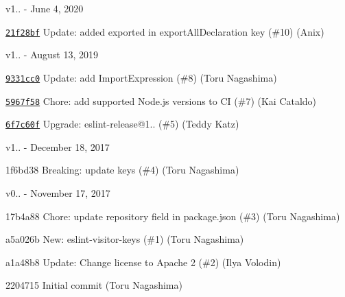 v1.. -\/ June 4, 2020


\begin{DoxyItemize}
\item \href{https://github.com/eslint/eslint-visitor-keys/commit/21f28bf11be5329d740a8bf6bdbcd0ef13bbf1a2}{\texttt{ {\ttfamily 21f28bf}}} Update\+: added exported in export\+All\+Declaration key (\#10) (Anix)
\end{DoxyItemize}

v1.. -\/ August 13, 2019


\begin{DoxyItemize}
\item \href{https://github.com/eslint/eslint-visitor-keys/commit/9331cc09e756e65b9044c9186445a474b037fac6}{\texttt{ {\ttfamily 9331cc0}}} Update\+: add Import\+Expression (\#8) (Toru Nagashima)
\item \href{https://github.com/eslint/eslint-visitor-keys/commit/5967f583b04f17fba9226aaa394e45d476d2b8af}{\texttt{ {\ttfamily 5967f58}}} Chore\+: add supported Node.\+js versions to CI (\#7) (Kai Cataldo)
\item \href{https://github.com/eslint/eslint-visitor-keys/commit/6f7c60fef2ceec9f6323202df718321cec45cab0}{\texttt{ {\ttfamily 6f7c60f}}} Upgrade\+: eslint-\/release@1.. (\#5) (Teddy Katz)
\end{DoxyItemize}

v1.. -\/ December 18, 2017


\begin{DoxyItemize}
\item 1f6bd38 Breaking\+: update keys (\#4) (Toru Nagashima)
\end{DoxyItemize}

v0.. -\/ November 17, 2017


\begin{DoxyItemize}
\item 17b4a88 Chore\+: update {\ttfamily repository} field in package.\+json (\#3) (Toru Nagashima)
\item a5a026b New\+: eslint-\/visitor-\/keys (\#1) (Toru Nagashima)
\item a1a48b8 Update\+: Change license to Apache 2 (\#2) (Ilya Volodin)
\item 2204715 Initial commit (Toru Nagashima) 
\end{DoxyItemize}